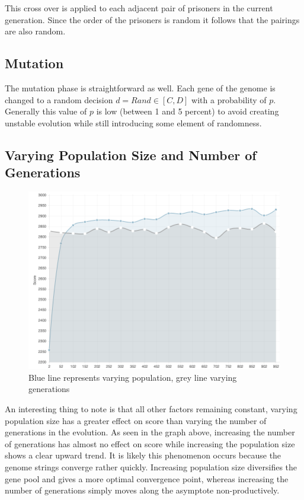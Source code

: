 \documentclass[12pt]{article}
\begin{document}
This cross over is applied to each adjacent pair of prisoners in the current
generation.  Since the order of the prisoners is random it follows that the pairings
are also random.

\subsection{Mutation}
\label{mutation}

The mutation phase is straightforward as well.  Each gene of the genome is changed
to a random decision $d = Rand \in [C, D]$ with a probability of $p$.  Generally
this value of $p$ is low (between 1 and 5 percent) to avoid creating unstable
evolution while still introducing some element of randomness.

\pagebreak

\subsection{Varying Population Size and Number of Generations}
\label{vpg}
\begin{figure}[h!]
    \caption{Blue line represents varying population, grey line varying generations}
    \centering
    \includegraphics[scale=0.5]{figures/gen_pop_compare}
\end{figure}

An interesting thing to note is that all other factors remaining constant,
varying population size has a greater effect on score than varying the number
of generations in the evolution. As seen in the graph above, increasing the number
of generations has almost no effect on score while increasing the population
size shows a clear upward trend.  It is likely this phenomenon occurs because the genome
strings converge rather quickly.  Increasing population size diversifies
the gene pool and gives a more optimal convergence point, whereas increasing
the number of generations simply moves along the asymptote non-productively.
\end{document}
